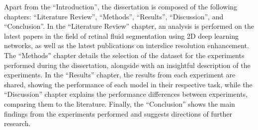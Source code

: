 Apart from the ``Introduction'', the dissertation is composed of the following chapters: ``Literature Review'', ``Methods'', ``Results'', ``Discussion'', and ``Conclusion''. In the ``Literature Review'' chapter, an analysis is performed on the latest papers in the field of retinal fluid segmentation using 2D deep learning networks, as well as the latest publications on interslice resolution enhancement. The ``Methods'' chapter details the selection of the dataset for the experiments performed during the dissertation, alongside with an insightful description of the experiments. In the ``Results'' chapter, the results from each experiment are shared, showing the performance of each model in their respective task, while the ``Discussion'' chapter explains the performance differences between experiments, comparing them to the literature. Finally, the ``Conclusion'' shows the main findings from the experiments performed and suggests directions of further research.
